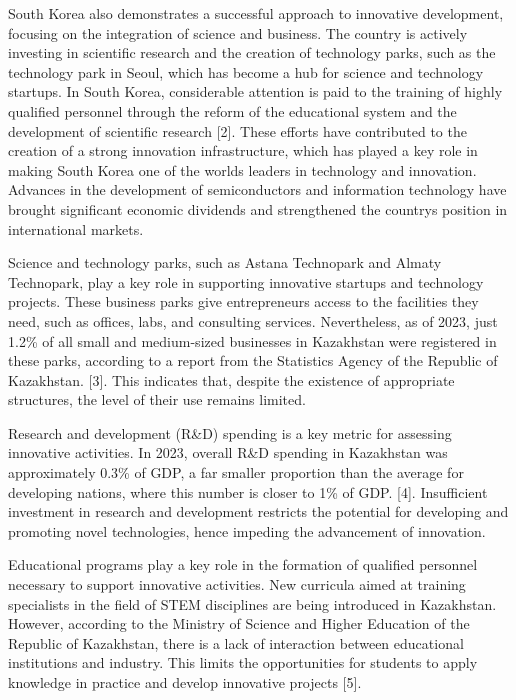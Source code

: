 \begin{multicols}{2}
South Korea also demonstrates a successful approach to innovative
development, focusing on the integration of science and business. The
country is actively investing in scientific research and the creation of
technology parks, such as the technology park in Seoul, which has become
a hub for science and technology startups. In South Korea, considerable
attention is paid to the training of highly qualified personnel through
the reform of the educational system and the development of scientific
research {[}2{]}. These efforts have contributed to the creation of a
strong innovation infrastructure, which has played a key role in making
South Korea one of the world\textquotesingle s leaders in technology and
innovation. Advances in the development of semiconductors and
information technology have brought significant economic dividends and
strengthened the country\textquotesingle s position in international
markets.

Science and technology parks, such as Astana Technopark and Almaty
Technopark, play a key role in supporting innovative startups and
technology projects. These business parks give entrepreneurs access to
the facilities they need, such as offices, labs, and consulting
services. Nevertheless, as of 2023, just 1.2\% of all small and
medium-sized businesses in Kazakhstan were registered in these parks,
according to a report from the Statistics Agency of the Republic of
Kazakhstan. {[}3{]}. This indicates that, despite the existence of
appropriate structures, the level of their use remains limited.

Research and development (R\&D) spending is a key metric for assessing
innovative activities. In 2023, overall R\&D spending in Kazakhstan was
approximately 0.3\% of GDP, a far smaller proportion than the average
for developing nations, where this number is closer to 1\% of GDP.
{[}4{]}. Insufficient investment in research and development restricts
the potential for developing and promoting novel technologies, hence
impeding the advancement of innovation.

Educational programs play a key role in the formation of qualified
personnel necessary to support innovative activities. New curricula
aimed at training specialists in the field of STEM disciplines are being
introduced in Kazakhstan. However, according to the Ministry of Science
and Higher Education of the Republic of Kazakhstan, there is a lack of
interaction between educational institutions and industry. This limits
the opportunities for students to apply knowledge in practice and
develop innovative projects {[}5{]}.


\end{multicols}
